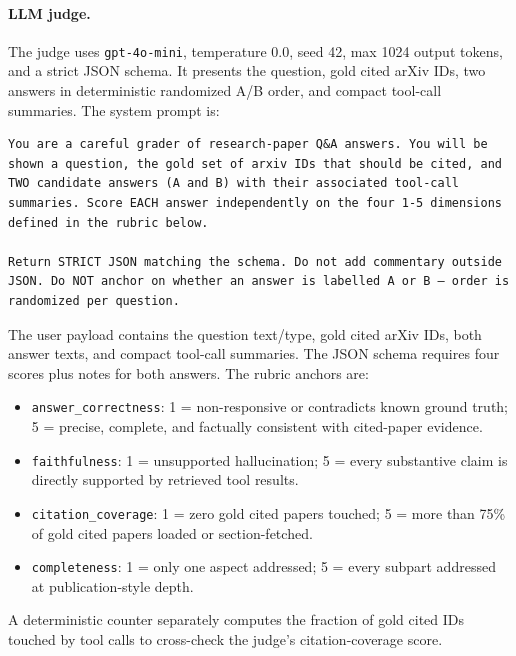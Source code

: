 \documentclass[10pt]{article}
\begin{document}
\paragraph{LLM judge.}
The judge uses \texttt{gpt-4o-mini}, temperature 0.0, seed 42, max 1024 output tokens, and a strict JSON schema. It presents the question, gold cited arXiv IDs, two answers in deterministic randomized A/B order, and compact tool-call summaries. The system prompt is:
\begin{lstlisting}[style=terminal]
You are a careful grader of research-paper Q&A answers. You will be shown a question, the gold set of arxiv IDs that should be cited, and TWO candidate answers (A and B) with their associated tool-call summaries. Score EACH answer independently on the four 1-5 dimensions defined in the rubric below.

Return STRICT JSON matching the schema. Do not add commentary outside JSON. Do NOT anchor on whether an answer is labelled A or B — order is randomized per question.
\end{lstlisting}
The user payload contains the question text/type, gold cited arXiv IDs, both answer texts, and compact tool-call summaries. The JSON schema requires four scores plus notes for both answers. The rubric anchors are:
\begin{itemize}[leftmargin=1.5em,itemsep=0.1em]
  \item \texttt{answer\_correctness}: 1 = non-responsive or contradicts known ground truth; 5 = precise, complete, and factually consistent with cited-paper evidence.
  \item \texttt{faithfulness}: 1 = unsupported hallucination; 5 = every substantive claim is directly supported by retrieved tool results.
  \item \texttt{citation\_coverage}: 1 = zero gold cited papers touched; 5 = more than 75\% of gold cited papers loaded or section-fetched.
  \item \texttt{completeness}: 1 = only one aspect addressed; 5 = every subpart addressed at publication-style depth.
\end{itemize}
A deterministic counter separately computes the fraction of gold cited IDs touched by tool calls to cross-check the judge's citation-coverage score.
\end{document}
